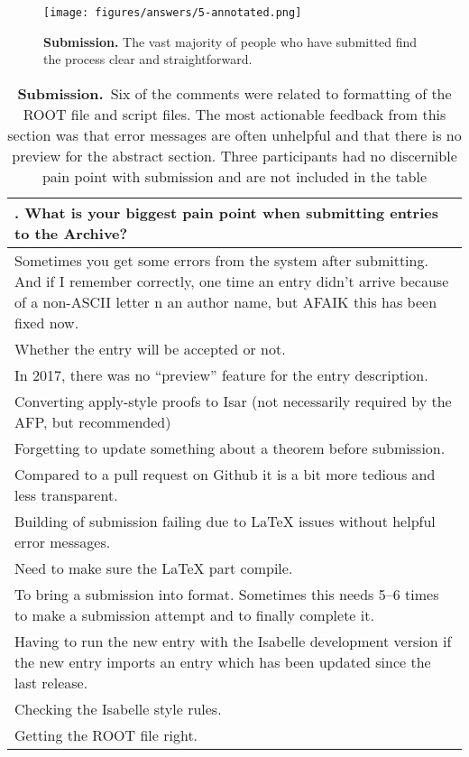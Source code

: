\documentclass[bsc,frontabs,oneside,singlespacing,parskip,deptreport,logo]{infthesis}
\begin{document}

\begin{figure}[ht]
    \centering
    \texttt{[image: figures/answers/5-annotated.png]}
    \caption{\textbf{Submission.} The vast majority of people who have submitted find the process clear and straightforward.}
    \label{fig:submission-1}
\end{figure}

\renewcommand{\arraystretch}{1.5}
\begin{table}[h!]
\centering
{}
\begin{tabularx}{\textwidth}{X}
{\sf 6. What is your biggest pain point when submitting entries to the Archive?}
\vspace{0.3cm}\\ 
\hline
\footnotesize
Sometimes you get some errors from the system after submitting. And if I remember correctly, one time an entry didn't arrive because of a non-ASCII letter n an author name, but AFAIK this has been fixed now.\\
\footnotesize
Whether the entry will be accepted or not. \\
\footnotesize
In 2017, there was no ``preview'' feature for the entry description.\\
\footnotesize
Converting apply-style proofs to Isar (not necessarily required by the AFP, but recommended)\\
\footnotesize
Forgetting to update something about a theorem before submission. \\
\footnotesize
Compared to a pull request on Github it is a bit more tedious and less transparent.\\
\footnotesize
Building of submission failing due to LaTeX issues without helpful error messages.\\
\footnotesize
Need to make sure the LaTeX part compile.\\
\footnotesize
To bring a submission into format. Sometimes this needs 5--6 times to make a submission attempt and to finally complete it.\\
\footnotesize
Having to run the new entry with the Isabelle development version if the new entry imports an entry which has been updated since the last release.\\
\footnotesize
Checking the Isabelle style rules. \\
\footnotesize
Getting the ROOT file right.\\ 
\hline
\end{tabularx}
\vspace{0.3cm} 
\caption{\textbf{Submission.}~Six of the comments were related to formatting of the ROOT file and script files. The most actionable feedback from this section was that error messages are often unhelpful and that there is no preview for the abstract section. Three participants had no discernible pain point with submission and are not included in the table}
\label{fig:submission-2}
\end{table}
\end{document}
